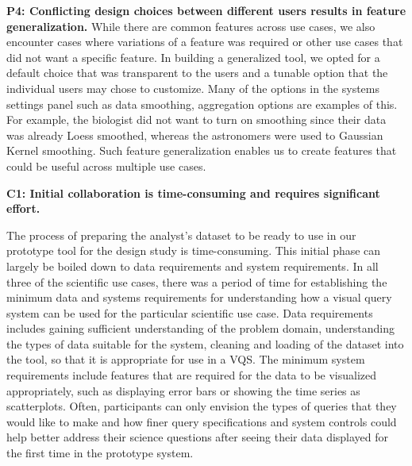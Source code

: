 {\par \textbf{P4: Conflicting design choices between different users results in feature generalization.}
While there are common features across use cases, we also encounter cases where variations of a feature was required or other use cases that did not want a specific feature. In building a generalized tool, we opted for a default choice that was transparent to the users and a tunable option that the individual users may chose to customize. Many of the options in the systems settings panel such as data smoothing, aggregation options are examples of this. For example, the biologist did not want to turn on smoothing since their data was already Loess smoothed, whereas the astronomers were used to Gaussian Kernel smoothing. Such feature generalization enables us to create features that could be useful across multiple use cases.
\par \textbf{C1: Initial collaboration is time-consuming and requires significant effort.} 
\par The process of preparing the analyst's dataset to be ready to use in our prototype tool for the design study is time-consuming. This initial phase can largely be boiled down to data requirements and system requirements. In all three of the scientific use cases, there was a period of time for establishing the minimum data and systems requirements for understanding how a visual query system can be used for the particular scientific use case. Data requirements includes gaining sufficient understanding of the problem domain, understanding the types of data suitable for the system, cleaning and loading of the dataset into the tool, so that it is appropriate for use in a VQS. The minimum system requirements include features that are required for the data to be visualized appropriately, such as displaying error bars or showing the time series as scatterplots. Often, participants can only envision the types of queries that they would like to make and how finer query specifications and system controls could help better address their science questions after seeing their data displayed for the first time in the prototype system.
}
